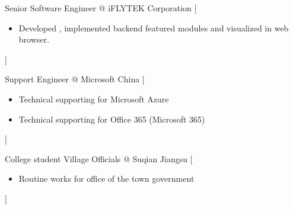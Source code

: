 \documentclass{resume}
\begin{document}
\begin{experiences}
    {Senior Software Engineer @ iFLYTEK Corporation}%
    [\begin{itemize}
      \item Developed , implemented backend featured modules and visualized in web browser.
    \end{itemize}]

  \separator{0.5ex}
    {Support Engineer @ \icon{\faMicrosoft} Microsoft China}%
    [\begin{itemize}
      \item Technical supporting for Microsoft Azure
      \item Technical supporting for Office 365 (Microsoft 365)
    \end{itemize}]
  
  \separator{0.5ex}
    {College student Village Officials @ Suqian Jiangsu}%
    [\begin{itemize}
      \item Routine works for office of the town government
    \end{itemize}]
\end{experiences}
\end{document}
